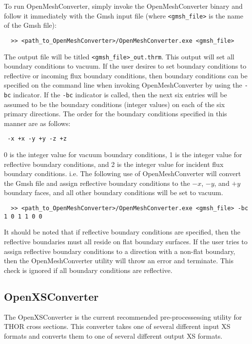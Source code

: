 To run OpenMeshConverter, simply invoke the OpenMeshConverter binary and follow it immediately with the Gmsh input file (where \verb"<gmsh_file>" is the name of the Gmsh file):
\begin{verbatim}
  >> <path_to_OpenMeshConverter>/OpenMeshConverter.exe <gmsh_file>
\end{verbatim}
The output file will be titled \verb"<gmsh_file>_out.thrm".
This output will set all boundary conditions to vacuum.
If the user desires to set boundary conditions to reflective or incoming flux boundary conditions, then boundary conditions can be specified on the command line when invoking OpenMeshConverter by using the \verb"-bc" indicator.
If the \verb"-bc" indicator is called, then the next six entries will be assumed to be the boundary conditions (integer values) on each of the six primary directions.
The order for the boundary conditions specified in this manner are as follows:
\begin{verbatim}
 -x +x -y +y -z +z
\end{verbatim}
0 is the integer value for vacuum boundary conditions, 1 is the integer value for reflective boundary conditions, and 2 is the integer value for incident flux boundary conditions.
i.e. The following use of OpenMeshConverter will convert the Gmsh file and assign reflective boundary conditions to the $-x$, $-y$, and $+y$ boundary faces, and all other boundary conditions will be set to vacuum.
\begin{verbatim}
  >> <path_to_OpenMeshConverter>/OpenMeshConverter.exe <gmsh_file> -bc 1 0 1 1 0 0
\end{verbatim}
It should be noted that if reflective boundary conditions are specified, then the reflective boundaries must all reside on flat boundary surfaces.
If the user tries to assign reflective boundary conditions to a direction with a non-flat boundary, then the OpenMeshConverter utility will throw an error and terminate.
This check is ignored if all boundary conditions are reflective.

\subsection{OpenXSConverter}\label{ch:getstart:sec:preproc:subsec:xsconv}

The OpenXSConverter is the current recommended pre-processessing utility for \ac{THOR} cross sections.
This converter takes one of several different input \ac{XS} formats and converts them to one of several different output \ac{XS} formats.

